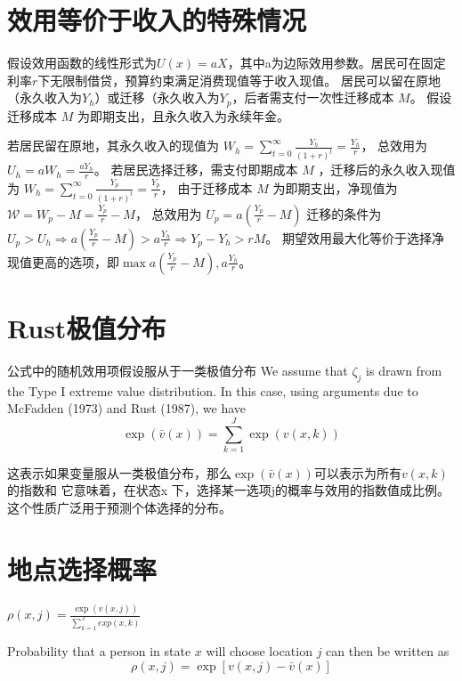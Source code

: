 \documentclass[a4paper,12pt]{article}
\begin{document}
\section{效用等价于收入的特殊情况}
假设效用函数的线性形式为$U(x)=a X$，其中a为边际效用参数。居民可在固定利率$r$下无限制借贷，预算约束满足消费现值等于收入现值。
居民可以留在原地（永久收入为$Y_h$）或迁移（永久收入为$Y_p$，后者需支付一次性迁移成本 $M$。
假设迁移成本 
$M$
为即期支出，且永久收入为永续年金。

若居民留在原地，其永久收入的现值为
$W_h = \sum\limits_{t=0}^\infty \frac{Y_h}{(1+r)^t}=\frac{Y_h}{r}$，
总效用为$U_h=a W_h = \frac{a Y_h}{r}$。
若居民选择迁移，需支付即期成本 
$M$
，迁移后的永久收入现值为
$W_h = \sum\limits_{t=0}^\infty \frac{Y_p}{(1+r)^t}=\frac{Y_p}{r}$，
由于迁移成本 
$M$
为即期支出，净现值为
$\mathcal{W}=W_p-M=\frac{Y_p}{r}-M$，
总效用为
$U_p=a(\frac{Y_p}{r}-M)$
迁移的条件为$U_p>U_h \Rightarrow a(\frac{Y_p}{r}-M) > a \frac{ Y_h}{r} \Rightarrow Y_p-Y_h > rM$。
期望效用最大化等价于选择净现值更高的选项，即$\max{a(\frac{Y_p}{r}-M), a \frac{ Y_h}{r}}$。

\section{Rust极值分布}
公式中的随机效用项假设服从于一类极值分布
We assume that $\zeta_j$ is drawn from the Type I extreme value distribution. In this case, using arguments due to McFadden (1973) and Rust (1987), we have
$$\exp\left(\bar{v}(x)\right) = \sum_{k=1}^J \exp\left(v(x, k)\right)$$

这表示如果变量服从一类极值分布，那么$\exp\left(\bar{v}(x)\right)$可以表示为所有$v(x, k)$的指数和
它意味着，在状态x 下，选择某一选项j的概率与效用的指数值成比例。
这个性质广泛用于预测个体选择的分布。

\section{地点选择概率}
$\rho(x,j)=\frac{\exp(v(x,j))}{\sum\limits_{k=1}^{J} exp(x,k)}$

Probability that a person in state $x$ will choose location $j$ can then be written as
$$\rho(x,j)=\exp[v(x,j)-\bar v(x)]$$



\newpage


\end{document}
